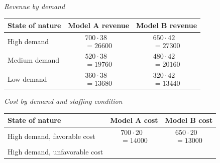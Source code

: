 \begin{ExamProblems}
		\begin{center}
			\textit{Revenue by demand} \\
			\begin{tabular}{l c c}
				\toprule
				State of nature & Model A revenue & Model B revenue \\
				\midrule
				High demand &
				$\begin{array}{l}
					700\cdot 38\\
					= 26600
				\end{array}$ &
				$\begin{array}{l}
					650\cdot 42\\
					= 27300
				\end{array}$ \\
				Medium demand &
				$\begin{array}{l}
					520\cdot 38\\
					= 19760
				\end{array}$ &
				$\begin{array}{l}
					480\cdot 42\\
					= 20160
				\end{array}$ \\
				Low demand &
				$\begin{array}{l}
					360\cdot 38\\
					= 13680
				\end{array}$ &
				$\begin{array}{l}
					320\cdot 42\\
					= 13440
				\end{array}$ \\
				\bottomrule
		\end{tabular}
		\end{center}
		\begin{center}
			\textit{Cost by demand and staffing condition} \\
			\begin{tabular}{l c c}
				\toprule
				State of nature & Model A cost & Model B cost \\
				\midrule
				High demand, favorable cost &
				$\begin{array}{l}
					700\cdot 20\\
					= 14000
				\end{array}$ &
				$\begin{array}{l}
					650\cdot 20\\
					= 13000
				\end{array}$ \\
				High demand, unfavorable cost &

\end{tabular}
\end{center}
\end{ExamProblems}
